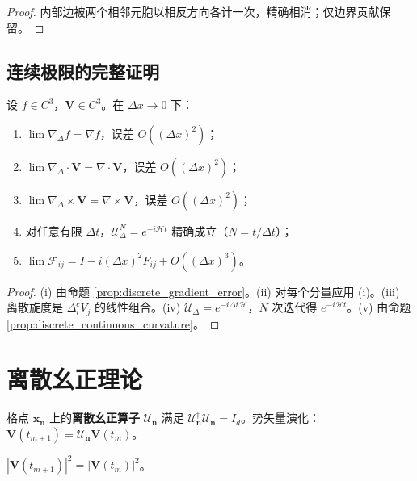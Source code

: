 \begin{proof}
内部边被两个相邻元胞以相反方向各计一次，精确相消；仅边界贡献保留。
\end{proof}

\subsection{连续极限的完整证明}

\begin{theorem}\label{thm:continuum_limit_full}
设 $f\in C^3$，$\mathbf{V}\in C^3$。在 $\Delta x\to 0$ 下：
\begin{enumerate}[label=(\roman*)]
    \item $\lim\nabla_{\Delta}f=\nabla f$，误差 $O((\Delta x)^2)$；
    \item $\lim\nabla_{\Delta}\cdot\mathbf{V}=\nabla\cdot\mathbf{V}$，误差 $O((\Delta x)^2)$；
    \item $\lim\nabla_{\Delta}\times\mathbf{V}=\nabla\times\mathbf{V}$，误差 $O((\Delta x)^2)$；
    \item 对任意有限 $\Delta t$，$\mathcal{U}_{\Delta}^N=e^{-i\mathcal{H}t}$ 精确成立（$N=t/\Delta t$）；
    \item $\lim\mathcal{F}_{ij}=I-i(\Delta x)^2F_{ij}+O((\Delta x)^3)$。
\end{enumerate}
\end{theorem}

\begin{proof}
(i) 由命题 \ref{prop:discrete_gradient_error}。(ii) 对每个分量应用 (i)。(iii) 离散旋度是 $\Delta_i^cV_j$ 的线性组合。(iv) $\mathcal{U}_{\Delta}=e^{-i\Delta t\mathcal{H}}$，$N$ 次迭代得 $e^{-i\mathcal{H}t}$。(v) 由命题 \ref{prop:discrete_continuous_curvature}。
\end{proof}

\section{离散幺正理论}\label{sec:discrete_unitary_theory}

\begin{definition}[离散幺正算子]\label{def:discrete_unitary}
格点 $\mathbf{x}_{\mathbf{n}}$ 上的\textbf{离散幺正算子} $\mathcal{U}_{\mathbf{n}}$ 满足 $\mathcal{U}_{\mathbf{n}}^\dagger\mathcal{U}_{\mathbf{n}}=I_d$。势矢量演化：$\mathbf{V}(t_{m+1})=\mathcal{U}_{\mathbf{n}}\mathbf{V}(t_m)$。
\end{definition}

\begin{proposition}[幺正性与模方守恒]\label{prop:unitary_norm_conservation}
$|\mathbf{V}(t_{m+1})|^2=|\mathbf{V}(t_m)|^2$。
\end{proposition}

